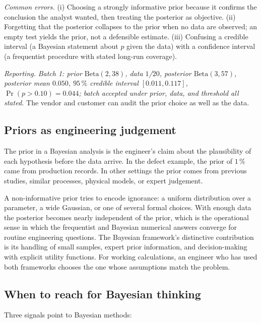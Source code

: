 \textit{Common errors.} (i) Choosing a strongly informative prior
because it confirms the conclusion the analyst wanted, then
treating the posterior as objective. (ii) Forgetting that the
posterior collapses to the prior when no data are observed; an
empty test yields the prior, not a defensible estimate. (iii)
Confusing a credible interval (a Bayesian statement about $p$
given the data) with a confidence interval (a frequentist
procedure with stated long-run coverage).

\textit{Reporting.} \emph{Batch 1: prior $\text{Beta}(2, 38)$,
data $1$/$20$, posterior $\text{Beta}(3, 57)$, posterior mean
$0.050$, $95 \,\%$ credible interval $[0.011, 0.117]$,
$\Pr(p > 0.10) = 0.044$; batch accepted under prior, data, and
threshold all stated.} The vendor and customer can audit the
prior choice as well as the data.

\subsection{Priors as engineering judgement}

The prior in a Bayesian analysis is the engineer's claim about the
plausibility of each hypothesis before the data arrive. In the
defect example, the prior of $1 \,\%$ came from production records.
In other settings the prior comes from previous studies, similar
processes, physical models, or expert judgement.

A non-informative prior tries to encode ignorance: a uniform
distribution over a parameter, a wide Gaussian, or one of several
formal choices. With enough data the posterior becomes nearly
independent of the prior, which is the operational sense in which
the frequentist and Bayesian numerical answers converge for routine
engineering questions. The Bayesian framework's distinctive
contribution is its handling of small samples, expert prior
information, and decision-making with explicit utility functions.
For working calculations, an engineer who has used both frameworks
chooses the one whose assumptions match the problem.

\subsection{When to reach for Bayesian thinking}

Three signals point to Bayesian methods:

